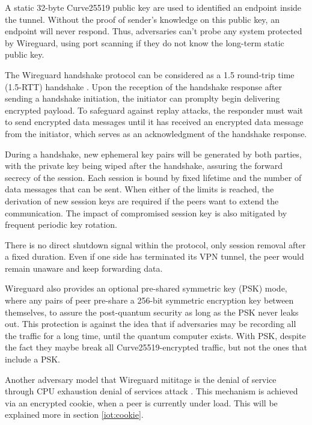  A static 32-byte Curve25519 \cite{curve} public key are used to identified an endpoint inside the tunnel. Without the
 proof of sender's knowledge on this public key, an endpoint will never respond. Thus, adversaries can't
 probe any system protected by Wireguard, using port scanning if they do not know the long-term static 
 public key.

The Wireguard handshake protocol can be considered as a 1.5 round-trip time (1.5-RTT) handshake \cite{pwu}. 
Upon the reception of the handshake response after sending a handshake initiation, the initiator
can promplty begin delivering encrypted payload. To safeguard against replay attacks, 
the responder must wait to send encrypted data messages until it has received an encrypted data 
message from the initiator, which serves as an acknowledgment of the handshake response.

During a handshake, new ephemeral key pairs will be generated by both parties, with the private key
being wiped after the handshake, assuring the forward secrecy of the session. Each session is bound
by fixed lifetime and the number of data messages that can be sent. When either of the limits is reached,
the derivation of new session keys are required if the peers want to extend the communication. The impact
of compromised session key is also mitigated by frequent periodic key rotation.

There is no direct shutdown signal within the protocol, only session removal after a fixed duration.
Even if one side has terminated its VPN tunnel, the peer would remain unaware and 
keep forwarding data.

Wireguard also provides an optional pre-shared symmetric key (PSK) mode, where any pairs of peer
pre-share a 256-bit symmetric encryption key between themselves, to assure the post-quantum 
security as long as the PSK never leaks out. This protection is against the idea that if 
adversaries may be recording all the traffic for a long time, until the quantum computer exists.
With PSK, despite the fact they maybe break all Curve25519-encrypted traffic, but not the ones that
include a PSK.

Another adversary model that Wireguard mititage is the denial of service through CPU exhaustion denial
of services attack \cite[p.~268]{cpu}. This mechanism is achieved via an encrypted cookie, when a peer is currently 
under load. This will be explained more in section \ref{iot:cookie}.

